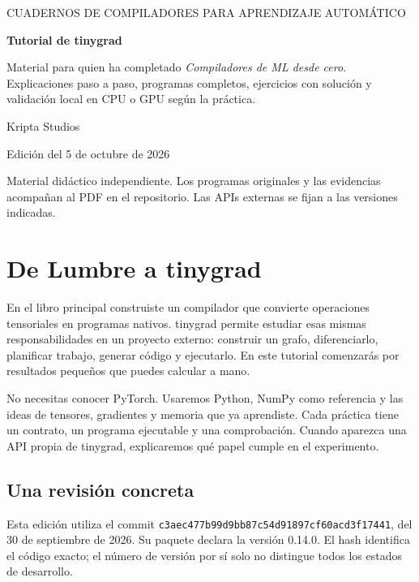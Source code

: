 \documentclass[12pt,a4paper,oneside]{report}
\begin{document}
\hypersetup{pageanchor=false}
\begin{titlepage}\centering\vspace*{1.5cm}
{\large CUADERNOS DE COMPILADORES PARA APRENDIZAJE AUTOMÁTICO\par}\vspace{1.4cm}
{\Huge\bfseries Tutorial de tinygrad\par}\vspace{1cm}
\begin{minipage}{.85\textwidth}Material para quien ha completado \emph{Compiladores de ML desde cero}. Explicaciones paso a paso, programas completos, ejercicios con solución y validación local en CPU o GPU según la práctica.\end{minipage}\vfill
{\large Kripta Studios\par}\vspace{.4cm}Edición del 5 de octubre de 2026\par\vspace{.5cm}
{\small Material didáctico independiente. Los programas originales y las evidencias acompañan al PDF en el repositorio. Las APIs externas se fijan a las versiones indicadas.\par}\end{titlepage}
\hypersetup{pageanchor=true}
\chapter{De Lumbre a tinygrad}
\label{tiny:inicio}
En el libro principal construiste un compilador que convierte operaciones tensoriales en programas nativos. tinygrad permite estudiar esas mismas responsabilidades en un proyecto externo: construir un grafo, diferenciarlo, planificar trabajo, generar código y ejecutarlo. En este tutorial comenzarás por resultados pequeños que puedes calcular a mano.

No necesitas conocer PyTorch. Usaremos Python, NumPy como referencia y las ideas de tensores, gradientes y memoria que ya aprendiste. Cada práctica tiene un contrato, un programa ejecutable y una comprobación. Cuando aparezca una API propia de tinygrad, explicaremos qué papel cumple en el experimento.

\section{Una revisión concreta}
Esta edición utiliza el commit \texttt{c3aec477b99d\allowbreak{}9bb87c54d918\allowbreak{}97cf60acd3f1\allowbreak{}7441}, del 30 de septiembre de 2026. Su paquete declara la versión 0.14.0. El hash identifica el código exacto; el número de versión por sí solo no distingue todos los estados de desarrollo.
\end{document}
